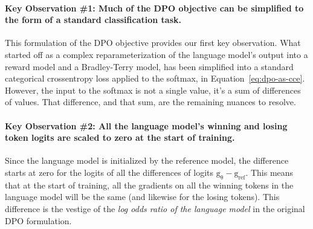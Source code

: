 \documentclass[twoside,11pt]{article}
\begin{document}
\paragraph{Key Observation \#1: Much of the DPO objective 
can be simplified to the form of a 
standard classification task.} \label{obs:dpo-as-cce}
This formulation of the DPO objective provides our first key observation. 
What started off as a complex reparameterization 
of the language model's output into a reward
model and a Bradley-Terry model, 
has been simplified into a standard 
categorical crossentropy loss applied to the softmax, in
Equation~\ref{eq:dpo-as-cce}. However, the
input to the softmax is not a single value, 
it's a sum of differences of values. That difference, and that
sum, are the remaining nuances to resolve. 

\paragraph{Key Observation \#2: All the language model's winning and losing
token logits are scaled to zero at the start of training.} 

Since
the language model is initialized by the reference model,
the difference starts at zero for the logits of all the
differences of logits $\mathrm{g_\theta} - \mathrm{g_\mathrm{ref}}$.
This means that at the start of training, all the gradients
on all the winning tokens in the language model will be the same
(and likewise for the losing tokens). This difference is the
vestige of the \emph{log odds ratio of the language model}
in the original DPO formulation. 
\end{document}
